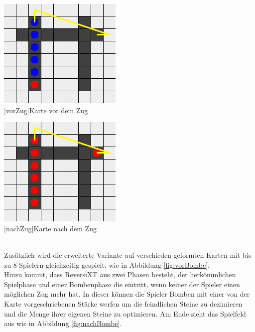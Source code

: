 \documentclass[12pt,a4paper,bibliography=totocnumbered,listof=totocnumbered,ngerman]{scrartcl}
\begin{document}
	\begin{minipage}[t]{0.45\linewidth}
        \centering
        \includegraphics[width=.75\linewidth]{pics/transitionBefore.png}\\
        [vorZug]{Karte vor dem Zug}
        \label{fig:vorZug}
    \end{minipage}
    \hfill
    \begin{minipage}[t]{0.45\linewidth}
        \centering
        \includegraphics[width=.75\linewidth]{pics/transitionAfter.png}\\
        [nachZug]{Karte nach dem Zug}
        \label{fig:nachZug}
    \end{minipage}
\\

Zusätzlich wird die erweiterte Variante auf verschieden geformten Karten mit bis zu 8 Spielern gleichzeitig gespielt, wie in Abbildung \ref{fig:vorBombe}.\\ 
Hinzu kommt, dass ReversiXT aus zwei Phasen besteht, der herkömmlichen Spielphase und einer Bombenphase die eintritt, wenn keiner der Spieler einen möglichen Zug mehr hat. In dieser können die Spieler Bomben mit einer von der Karte vorgeschriebenen Stärke werfen um die feindlichen Steine zu dezimieren und die Menge ihrer eigenen Steine zu optimieren. Am Ende sieht das Spielfeld aus wie in Abbildung \ref{fig:nachBombe}. \\
\end{document}

